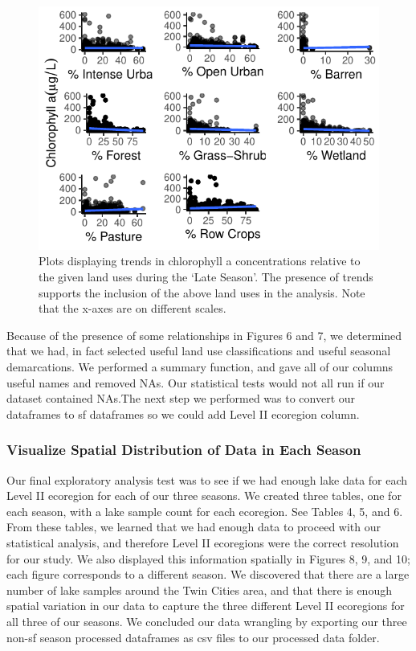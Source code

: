 \documentclass[12pt,]{article}
\begin{document}
\begin{figure}
\centering
\includegraphics{Bollt_Greif_Raby_Roth_Project_Final_files/figure-latex/unnamed-chunk-9-1.pdf}
\caption{Plots displaying trends in chlorophyll a concentrations
relative to the given land uses during the `Late Season'. The presence
of trends supports the inclusion of the above land uses in the analysis.
Note that the x-axes are on different scales.}
\end{figure}

Because of the presence of some relationships in Figures 6 and 7, we
determined that we had, in fact selected useful land use classifications
and useful seasonal demarcations. We performed a summary function, and
gave all of our columns useful names and removed NAs. Our statistical
tests would not all run if our dataset contained NAs.The next step we
performed was to convert our dataframes to sf dataframes so we could add
Level II ecoregion column.

\hypertarget{visualize-spatial-distribution-of-data-in-each-season}{%
\subsubsection{Visualize Spatial Distribution of Data in Each
Season}\label{visualize-spatial-distribution-of-data-in-each-season}}

Our final exploratory analysis test was to see if we had enough lake
data for each Level II ecoregion for each of our three seasons. We
created three tables, one for each season, with a lake sample count for
each ecoregion. See Tables 4, 5, and 6. From these tables, we learned
that we had enough data to proceed with our statistical analysis, and
therefore Level II ecoregions were the correct resolution for our study.
We also displayed this information spatially in Figures 8, 9, and 10;
each figure corresponds to a different season. We discovered that there
are a large number of lake samples around the Twin Cities area, and that
there is enough spatial variation in our data to capture the three
different Level II ecoregions for all three of our seasons. We concluded
our data wrangling by exporting our three non-sf season processed
dataframes as csv files to our processed data folder.
\end{document}
